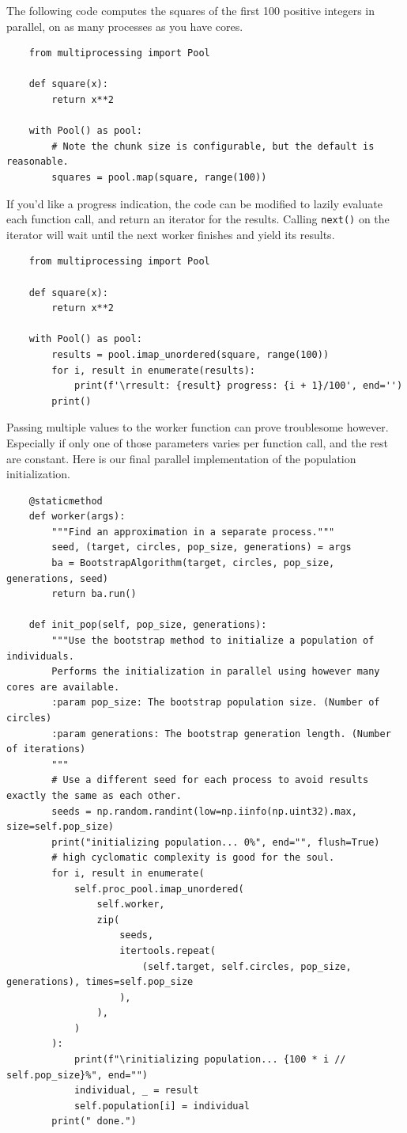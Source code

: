 \documentclass{article}
\begin{document}
The following code computes the squares of the first 100 positive integers in parallel, on as many
processes as you have cores.
\begin{verbatim}
    from multiprocessing import Pool

    def square(x):
        return x**2

    with Pool() as pool:
        # Note the chunk size is configurable, but the default is reasonable.
        squares = pool.map(square, range(100))
\end{verbatim}
If you'd like a progress indication, the code can be modified to lazily evaluate each function
call, and return an iterator for the results. Calling \texttt{next()} on the iterator
will wait until the next worker finishes and yield its results.
\begin{verbatim}
    from multiprocessing import Pool

    def square(x):
        return x**2

    with Pool() as pool:
        results = pool.imap_unordered(square, range(100))
        for i, result in enumerate(results):
            print(f'\rresult: {result} progress: {i + 1}/100', end='')
        print()
\end{verbatim}

Passing multiple values to the worker function can prove troublesome however. Especially if only
one of those parameters varies per function call, and the rest are constant. Here is our final
parallel implementation of the population initialization.

\begin{verbatim}
    @staticmethod
    def worker(args):
        """Find an approximation in a separate process."""
        seed, (target, circles, pop_size, generations) = args
        ba = BootstrapAlgorithm(target, circles, pop_size, generations, seed)
        return ba.run()

    def init_pop(self, pop_size, generations):
        """Use the bootstrap method to initialize a population of individuals.
        Performs the initialization in parallel using however many cores are available.
        :param pop_size: The bootstrap population size. (Number of circles)
        :param generations: The bootstrap generation length. (Number of iterations)
        """
        # Use a different seed for each process to avoid results exactly the same as each other.
        seeds = np.random.randint(low=np.iinfo(np.uint32).max, size=self.pop_size)
        print("initializing population... 0%", end="", flush=True)
        # high cyclomatic complexity is good for the soul.
        for i, result in enumerate(
            self.proc_pool.imap_unordered(
                self.worker,
                zip(
                    seeds,
                    itertools.repeat(
                        (self.target, self.circles, pop_size, generations), times=self.pop_size
                    ),
                ),
            )
        ):
            print(f"\rinitializing population... {100 * i // self.pop_size}%", end="")
            individual, _ = result
            self.population[i] = individual
        print(" done.")
\end{verbatim}
\end{document}
